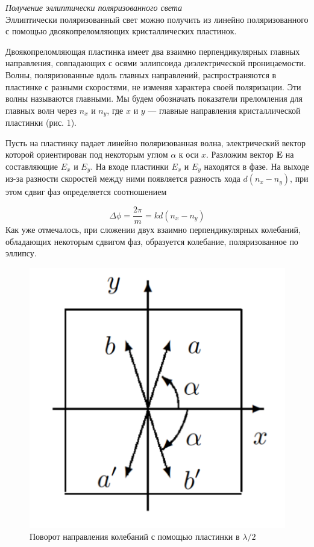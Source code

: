 \documentclass[a4paper, 12pt]{article}%
\begin{document}
	\textit{Получение эллиптически поляризованного света}\\
	
	Эллиптически поляризованный свет можно получить из линейно поляризованного с
	помощью двоякопреломляющих кристаллических пластинок.
	
	Двоякопреломляющая пластинка имеет два взаимно перпендикулярных главных направления, совпадающих с осями эллипсоида диэлектрической проницаемости. Волны, поляризованные вдоль главных направлений, распространяются в пластинке с разными скоростями, не изменяя характера своей поляризации. Эти волны называются главными. Мы будем обозначать показатели преломления для главных волн через $ n_x $ и $ n_y $, где $ x $ и $ y $ --- главные направления кристаллической пластинки (рис. 1).
	
	\newpage
	
	Пусть на пластинку падает линейно поляризованная волна, электрический вектор которой ориентирован под некоторым углом $ \alpha $ к оси
	$ x $. Разложим вектор $ \mathbf{E} $ на составляющие $ E_x $ и $ E_y $. На входе пластинки $ E_x $ и $ E_y $ находятся в фазе. На выходе из-за разности скоростей между ними появляется разность хода $ d(n_x - n_y) $, при этом сдвиг фаз определяется соотношением
	
	\begin{equation}\label{}
		\Delta \phi =  \dfrac{2\pi}{m} = k d(n_x - n_y)
	\end{equation}
	Как уже отмечалось, при сложении двух взаимно перпендикулярных колебаний, обладающих некоторым сдвигом фаз, образуется колебание, поляризованное по эллипсу.
	
	\begin{figure}
		\includegraphics[width=\linewidth]{2}
		\caption{Поворот направления колебаний с помощью пластинки в $ \lambda / 2 $}
		\label{ris 2}
	\end{figure}
	
\end{document}

